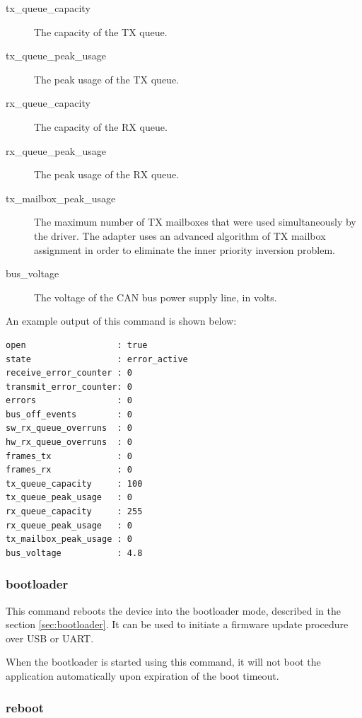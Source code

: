 \documentclass{zubaxdoc}
\begin{document}
\begin{description}
    \item[tx\_queue\_capacity] The capacity of the TX queue.

    \item[tx\_queue\_peak\_usage] The peak usage of the TX queue.

    \item[rx\_queue\_capacity] The capacity of the RX queue.

    \item[rx\_queue\_peak\_usage] The peak usage of the RX queue.

    \item[tx\_mailbox\_peak\_usage] The maximum number of TX mailboxes that were used simultaneously by the driver.
                                    The adapter uses an advanced algorithm of TX mailbox assignment in order to
                                    eliminate the inner priority inversion problem.

    \item[bus\_voltage] The voltage of the CAN bus power supply line, in volts.
\end{description}

An example output of this command is shown below:

\begin{verbatim}
open                  : true
state                 : error_active
receive_error_counter : 0
transmit_error_counter: 0
errors                : 0
bus_off_events        : 0
sw_rx_queue_overruns  : 0
hw_rx_queue_overruns  : 0
frames_tx             : 0
frames_rx             : 0
tx_queue_capacity     : 100
tx_queue_peak_usage   : 0
rx_queue_capacity     : 255
rx_queue_peak_usage   : 0
tx_mailbox_peak_usage : 0
bus_voltage           : 4.8
\end{verbatim}

\subsubsection{bootloader}

This command reboots the device into the bootloader mode, described in the section \ref{sec:bootloader}.
It can be used to initiate a firmware update procedure over USB or UART.

When the bootloader is started using this command, it will not boot the application automatically
upon expiration of the boot timeout.

\subsubsection{reboot}
\end{document}
